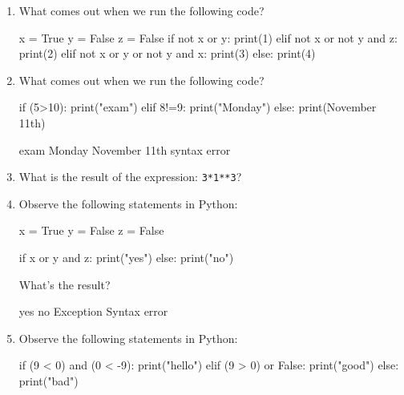 \begin{enumerate}

\item What comes out when we run the following code?

\begin{python}
x = True
y = False
z = False
if not x or y:
    print(1)
elif not x or not y and z:
    print(2)
elif not x or y or not y and x:
    print(3)
else:
    print(4)
\end{python}


\begin{choices}
\end{choices}



\item What comes out when we run the following code?

\begin{python}
if (5>10):
    print("exam")
elif 8!=9:
    print("Monday")
else:
    print(November 11th)
\end{python}

\begin{choices}
    \choice exam
    \choice Monday %
    \choice November 11th
    \choice syntax error
\end{choices}


\item What is the result of the expression: \verb|3*1**3|?

\begin{choices}
\end{choices}


\item Observe the following statements in Python:
\begin{python}
x = True
y = False
z = False

if x or y and z:
    print("yes")
else:
    print("no")
\end{python}

What's the result?

\begin{choices}
    \choice yes %
    \choice no
    \choice Exception
    \choice Syntax error
\end{choices}

\item  Observe the following statements in Python:
\begin{python}
if (9 < 0) and (0 < -9):
    print("hello")
elif (9 > 0) or False:
    print("good")
else:
    print("bad")
\end{python}


\end{enumerate}
